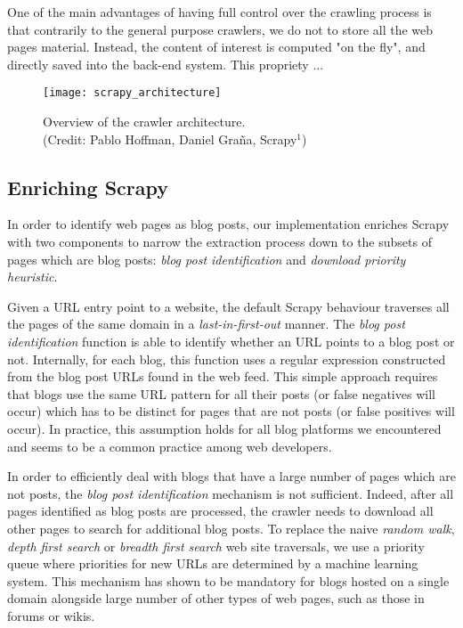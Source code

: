 

One of the main advantages of having full control over the crawling process is that contrarily to the general purpose crawlers, we do not to store all the web pages material. Instead, the content of interest is computed "on the fly", and directly saved into the back-end system. This propriety ...

\begin{figure}
  \capstart
  \centering
  \texttt{[image: scrapy\_architecture]}
  \caption{Overview of the crawler architecture.\\(Credit: Pablo Hoffman, Daniel Graña, Scrapy$^1$)} %
  \label{scrapyarchitecture}
\end{figure}


\subsection{Enriching Scrapy}\label{enrichingscrapy}

In order to identify web pages as blog posts, our implementation enriches Scrapy with two components to narrow the extraction process down to the subsets of pages which are blog posts: \emph{blog post identification} and \emph{download priority heuristic}.

Given a URL entry point to a website, the default Scrapy behaviour traverses all the pages of the same domain in a \emph{last-in-first-out} manner. The \emph{blog post identification} function is able to identify whether an URL points to a blog post or not. Internally, for each blog, this function uses a regular expression constructed from the blog post URLs found in the web feed. This simple approach requires that blogs use the same URL pattern for all their posts (or false negatives will occur) which has to be distinct for pages that are not posts (or false positives will occur). In practice, this assumption holds for all blog platforms we encountered and seems to be a common practice among web developers.

In order to efficiently deal with blogs that have a large number of pages which are not posts, the \emph{blog post identification} mechanism is not sufficient. Indeed, after all pages identified as blog posts are processed, the crawler needs to download all other pages to search for additional blog posts. To replace the naive \emph{random walk}, \emph{depth first search} or \emph{breadth first search} web site traversals, we use a priority queue where priorities for new URLs are determined by a machine learning system. This mechanism has shown to be mandatory for blogs hosted on a single domain alongside large number of other types of web pages, such as those in forums or wikis.

